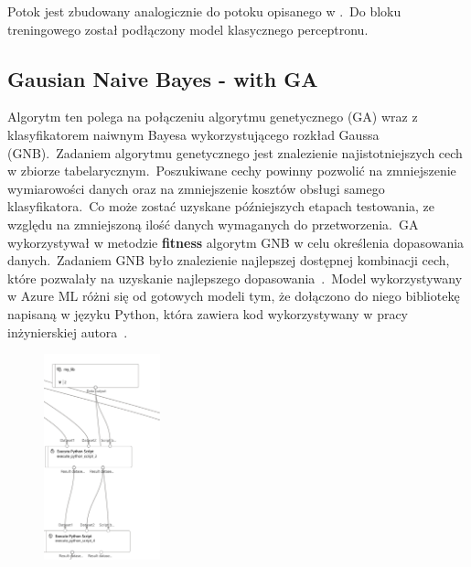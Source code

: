 Potok jest zbudowany analogicznie do potoku opisanego w .\ Do bloku treningowego został podłączony model klasycznego perceptronu.

\subsection{Gausian Naive Bayes - with GA}
Algorytm ten polega na połączeniu algorytmu genetycznego (GA) wraz z klasyfikatorem naiwnym Bayesa wykorzystującego rozkład Gaussa (GNB).\ Zadaniem algorytmu genetycznego jest znalezienie najistotniejszych cech w zbiorze tabelarycznym.\ Poszukiwane cechy powinny pozwolić na zmniejszenie wymiarowości danych oraz na zmniejszenie kosztów obsługi samego klasyfikatora.\ Co może zostać uzyskane późniejszych etapach testowania, ze względu na zmniejszoną ilość danych wymaganych do przetworzenia.\ GA wykorzystywał w metodzie \textbf{fitness} algorytm GNB w celu określenia dopasowania danych.\ Zadaniem GNB było znalezienie najlepszej dostępnej kombinacji cech, które pozwalały na uzyskanie najlepszego dopasowania~\cite{Blyszcz2022}.\ Model wykorzystywany w Azure ML różni się od gotowych modeli tym, że dołączono do niego bibliotekę napisaną w języku Python, która zawiera kod wykorzystywany w pracy inżynierskiej autora~\cite{Suvres2023}.
\begin{figure}[H]
    \centering
    \includegraphics[width=0.3\textwidth]{images/ga_pipe}
    \label{fig:ga-pipe}
\end{figure}

